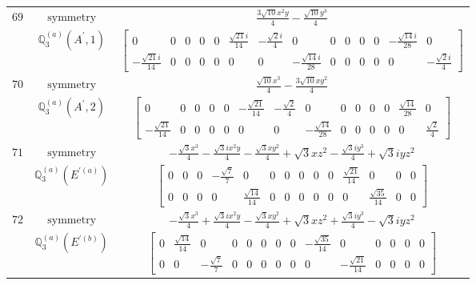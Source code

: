 \documentclass[fleqn,8pt,landscape]{jsarticle}
\begin{document}
\begin{longtable}{ccc}
$ 69 $ & $ \text{symmetry} $ & $ \frac{3 \sqrt{10} x^{2} y}{4} - \frac{\sqrt{10} y^{3}}{4} $ \\
$  $ & $ \mathbb{Q}_{3}^{(a)}(A^{\prime},1) $ & $ \begin{bmatrix} 0 & 0 & 0 & 0 & 0 & \frac{\sqrt{21} i}{14} & - \frac{\sqrt{2} i}{4} & 0 & 0 & 0 & 0 & 0 & - \frac{\sqrt{14} i}{28} & 0 \\ - \frac{\sqrt{21} i}{14} & 0 & 0 & 0 & 0 & 0 & 0 & - \frac{\sqrt{14} i}{28} & 0 & 0 & 0 & 0 & 0 & - \frac{\sqrt{2} i}{4} \end{bmatrix} $ \\ \hline
$ 70 $ & $ \text{symmetry} $ & $ \frac{\sqrt{10} x^{3}}{4} - \frac{3 \sqrt{10} x y^{2}}{4} $ \\
$  $ & $ \mathbb{Q}_{3}^{(a)}(A^{\prime},2) $ & $ \begin{bmatrix} 0 & 0 & 0 & 0 & 0 & - \frac{\sqrt{21}}{14} & - \frac{\sqrt{2}}{4} & 0 & 0 & 0 & 0 & 0 & \frac{\sqrt{14}}{28} & 0 \\ - \frac{\sqrt{21}}{14} & 0 & 0 & 0 & 0 & 0 & 0 & - \frac{\sqrt{14}}{28} & 0 & 0 & 0 & 0 & 0 & \frac{\sqrt{2}}{4} \end{bmatrix} $ \\ \hline
$ 71 $ & $ \text{symmetry} $ & $ - \frac{\sqrt{3} x^{3}}{4} - \frac{\sqrt{3} i x^{2} y}{4} - \frac{\sqrt{3} x y^{2}}{4} + \sqrt{3} x z^{2} - \frac{\sqrt{3} i y^{3}}{4} + \sqrt{3} i y z^{2} $ \\
$  $ & $ \mathbb{Q}_{3}^{(a)}(E^{\prime(a)}) $ & $ \begin{bmatrix} 0 & 0 & 0 & - \frac{\sqrt{7}}{7} & 0 & 0 & 0 & 0 & 0 & 0 & \frac{\sqrt{21}}{14} & 0 & 0 & 0 \\ 0 & 0 & 0 & 0 & \frac{\sqrt{14}}{14} & 0 & 0 & 0 & 0 & 0 & 0 & \frac{\sqrt{35}}{14} & 0 & 0 \end{bmatrix} $ \\ \hline
$ 72 $ & $ \text{symmetry} $ & $ - \frac{\sqrt{3} x^{3}}{4} + \frac{\sqrt{3} i x^{2} y}{4} - \frac{\sqrt{3} x y^{2}}{4} + \sqrt{3} x z^{2} + \frac{\sqrt{3} i y^{3}}{4} - \sqrt{3} i y z^{2} $ \\
$  $ & $ \mathbb{Q}_{3}^{(a)}(E^{\prime(b)}) $ & $ \begin{bmatrix} 0 & \frac{\sqrt{14}}{14} & 0 & 0 & 0 & 0 & 0 & 0 & - \frac{\sqrt{35}}{14} & 0 & 0 & 0 & 0 & 0 \\ 0 & 0 & - \frac{\sqrt{7}}{7} & 0 & 0 & 0 & 0 & 0 & 0 & - \frac{\sqrt{21}}{14} & 0 & 0 & 0 & 0 \end{bmatrix} $ \\ \hline

\end{longtable}
\end{document}
